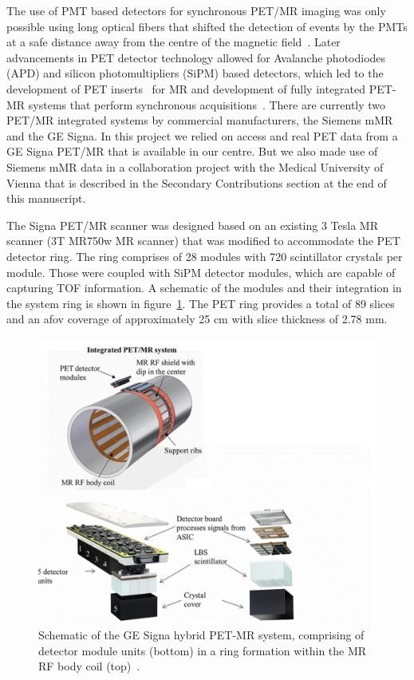 The use of PMT based detectors for synchronous PET/MR imaging was only possible using long optical fibers that shifted the detection of events by the PMTs at a safe distance away from the centre of the magnetic field~\cite{Shao1997,Mackewn2010}. Later advancements in PET detector technology allowed for Avalanche photodiodes (APD) and silicon photomultipliers (SiPM) based detectors, which led to the development of PET inserts~\cite{Kolb2012} for MR and development of fully integrated PET-MR systems that perform synchronous acquisitions~\cite{Delso2011,Grant2016,Levin2016}.
There are currently two PET/MR integrated systems by commercial manufacturers, the Siemens mMR and the GE Signa. In this project we relied on access and real PET data from a GE Signa PET/MR that is available in our centre. But we also made use of Siemens mMR data in a collaboration project with the Medical University of Vienna that is described in the Secondary Contributions section at the end of this manuscript. 

The Signa PET/MR scanner was designed based on an existing 3 Tesla MR scanner (3T MR750w MR scanner) that was modified to accommodate the PET detector ring. The ring comprises of 28 modules with 720 scintillator crystals per module. Those were coupled with SiPM detector modules, which are capable of capturing TOF information. A schematic of the modules and their integration in the system ring is shown in figure~\ref{fig_2:SignaPETMR_Integrated_System}. The PET ring provides a total of 89 slices and an \gls{afov} coverage of approximately 25 cm with slice thickness of 2.78 mm.

\begin{figure} [h!]
\centering
\includegraphics[scale=0.45,angle=0]{2_Theory_Methods/figures/SignaPETMR_Integrated_System.pdf}
\caption{Schematic of the GE Signa hybrid PET-MR system, comprising of detector module units (bottom) in a ring formation within the MR RF body coil (top)~\cite{Levin2016}.} 
\label{fig_2:SignaPETMR_Integrated_System}
\end{figure} 

